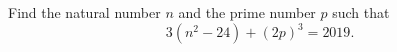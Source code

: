 Find the natural number $n$ and the prime number $p$ such that
\[
3\left(n^2-24\right)+(2p)^3=2019 .
\]
